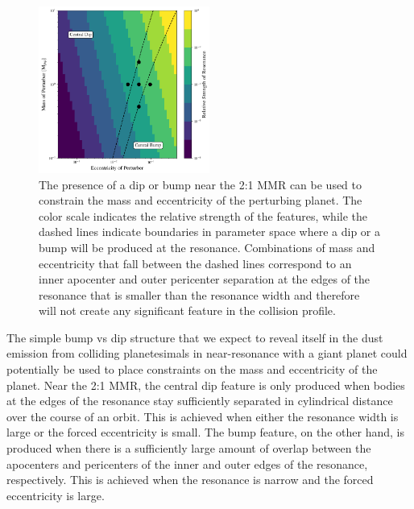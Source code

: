 \documentclass[fleqn,usenatbib]{mnras}
\begin{document}
\begin{figure}
\begin{center}
    \includegraphics[width=0.5\textwidth]{figures/bump_dip_diag.png}
    \caption{The presence of a dip or bump near the 2:1 MMR can be used to constrain the mass and eccentricity
    of the perturbing planet. The color scale indicates the relative strength of the features, while the dashed lines
    indicate boundaries in parameter space where a dip or a bump will be produced at the resonance. Combinations of mass and eccentricity that fall 
    between the dashed lines correspond to an inner apocenter and outer pericenter separation at the edges of the resonance that is smaller than the 
    resonance width and therefore will not create any significant feature in the collision profile.\label{fig:bump_dip_diag}}
\end{center}
\end{figure}

The simple bump vs dip structure that we expect to reveal itself in the dust emission from colliding planetesimals in near-resonance with a giant 
planet could potentially be used to place constraints on the mass and eccentricity of the planet. Near the 2:1 MMR, the central dip feature is only 
produced when bodies at the edges of the resonance stay sufficiently separated in cylindrical distance over the course of an orbit. This is achieved 
when either the resonance width is large or the forced eccentricity is small. The bump feature, on the other hand, is produced when there is a 
sufficiently large amount of overlap between the apocenters and pericenters of the inner and outer edges of the resonance, respectively. This is 
achieved when the resonance is narrow and the forced eccentricity is large.
\end{document}
